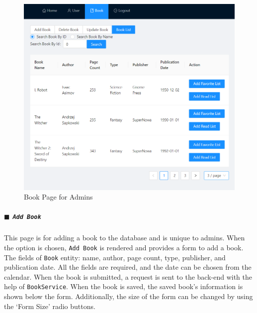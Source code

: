 \begin{minipage}{.49\textwidth}
  \begin{figure}[H]
    \centering
    \includegraphics[width=\linewidth]{img/front-end/book-admin.png}
    \caption{Book Page for Admins}
  \end{figure}
\end{minipage}

\subparagraph{$\blacksquare$ \texttt{Add Book}}

This page is for adding a book to the database and is unique to admins. When the option is chosen, \texttt{Add Book} is rendered and provides a form to add a book. The fields of \texttt{Book} entity: name, author, page count, type, publisher, and publication date. All the fields are required, and the date can be chosen from the calendar. When the book is submitted, a request is sent to the back-end with the help of \texttt{BookService}. When the book is saved, the saved book's information is shown below the form. Additionally, the size of the form can be changed by using the `Form Size' radio buttons.

